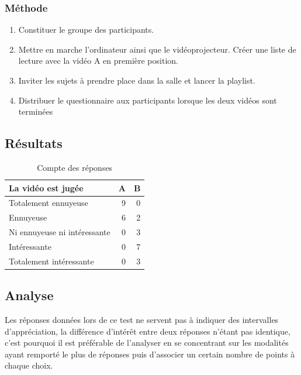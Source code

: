\documentclass[12pt,fleqn,oneside,openany]{book} %
\begin{document}
\subsubsection{Méthode} \label{sssec:methode1.2}
\begin{enumerate}
	\item Constituer le groupe des participants.
	\item Mettre en marche l'ordinateur ainsi que le vidéoprojecteur. Créer une liste de lecture avec la vidéo A en première position.
	\item Inviter les sujets à prendre place dans la salle et lancer la playlist.
	\item Distribuer le questionnaire aux participants lorsque les deux vidéos sont terminées
\end{enumerate}

\subsection{Résultats} \label{ssec:resultats1.2}
\begin{table}[h]
	\centering
	\caption{Compte des réponses} \label{tbl:résultats1.2}
	\begin{tabular}{lrr}
		\toprule
		\textbf{La vidéo est jugée} & \textbf{A} & \textbf{B} \\ \midrule
		Totalement ennuyeuse & 9 & 0 \\ 
		Ennuyeuse & 6 & 2 \\
		Ni ennuyeuse ni intéressante & 0 & 3 \\
		Intéressante & 0 & 7 \\ 
		Totalement intéressante & 0 & 3 \\ \bottomrule
	\end{tabular}
\end{table}

\subsection{Analyse} \label{ssec:analyse1.2}

\begin{remark}
Les réponses données lors de ce test ne servent pas à indiquer des intervalles d'appréciation, la différence d'intérêt entre deux réponses n'étant pas identique, c'est pourquoi il est préférable de l'analyser en se concentrant sur les modalités ayant remporté le plus de réponses puis d'associer un certain nombre de points à chaque choix.
\end{remark}
\end{document}
